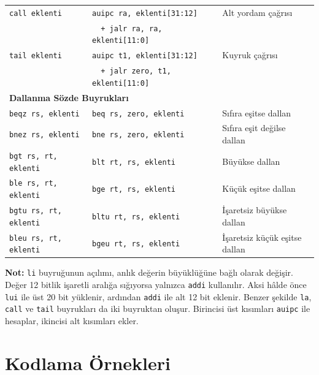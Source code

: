 {\begin{longtable}{@{}l@{\quad}l@{\quad}l@{}}
\texttt{call eklenti} &
\texttt{auipc ra, eklenti[31:12]} &
Alt yordam çağrısı\index{call} \\
 &
\texttt{~~+ jalr ra, ra, eklenti[11:0]} &
 \\[3pt]

\texttt{tail eklenti} &
\texttt{auipc t1, eklenti[31:12]} &
Kuyruk çağrısı\index{tail} \\
 &
\texttt{~~+ jalr zero, t1, eklenti[11:0]} &
 \\[3pt]

\midrule
\multicolumn{3}{l}{\textbf{Dallanma Sözde Buyrukları}} \\
\midrule
\texttt{beqz rs, eklenti} &
\texttt{beq rs, zero, eklenti} &
Sıfıra eşitse dallan\index{beqz} \\[3pt]

\texttt{bnez rs, eklenti} &
\texttt{bne rs, zero, eklenti} &
Sıfıra eşit değilse dallan\index{bnez} \\[3pt]

\texttt{bgt rs, rt, eklenti} &
\texttt{blt rt, rs, eklenti} &
Büyükse dallan\index{bgt} \\[3pt]

\texttt{ble rs, rt, eklenti} &
\texttt{bge rt, rs, eklenti} &
Küçük eşitse dallan\index{ble} \\[3pt]

\texttt{bgtu rs, rt, eklenti} &
\texttt{bltu rt, rs, eklenti} &
İşaretsiz büyükse dallan\index{bgtu} \\[3pt]

\texttt{bleu rs, rt, eklenti} &
\texttt{bgeu rt, rs, eklenti} &
İşaretsiz küçük eşitse dallan\index{bleu} \\[3pt]

\end{longtable}
}%

\noindent
\textbf{Not:} \texttt{li} buyruğunun açılımı, anlık değerin büyüklüğüne bağlı olarak değişir. Değer 12 bitlik işaretli aralığa sığıyorsa yalnızca \texttt{addi} kullanılır. Aksi hâlde önce \texttt{lui} ile üst 20 bit yüklenir, ardından \texttt{addi} ile alt 12 bit eklenir. Benzer şekilde \texttt{la}, \texttt{call} ve \texttt{tail} buyrukları da iki buyruktan oluşur. Birincisi üst kısımları \texttt{auipc} ile hesaplar, ikincisi alt kısımları ekler.


\section{Kodlama Örnekleri}
\label{sec:ekc-kodlama-ornekleri}

